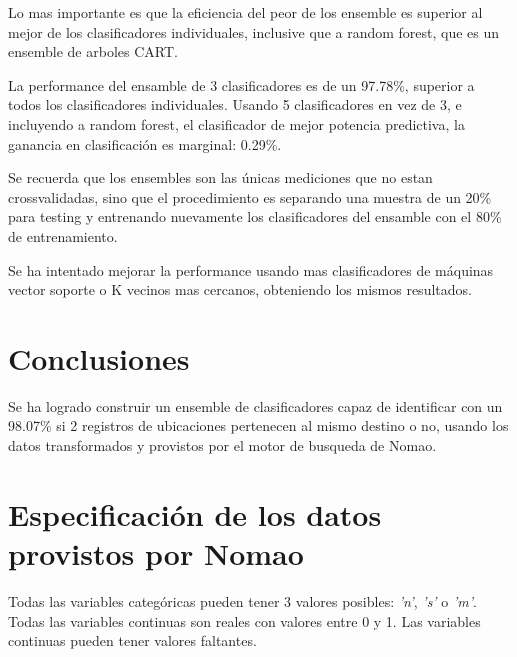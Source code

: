 \documentclass[journal]{IEEEtran}
\begin{document}
Lo mas importante es que la eficiencia del peor de los ensemble
es superior al mejor de los clasificadores individuales, inclusive
que a random forest, que es un ensemble de arboles CART.

La performance del ensamble de 3 clasificadores es de un 97.78\%, 
superior a todos los clasificadores individuales. Usando
5 clasificadores en vez de 3, e incluyendo a random forest, el clasificador de 
mejor potencia predictiva, la ganancia en clasificación es marginal: 0.29\%.

Se recuerda que los ensembles son las únicas
mediciones que no estan crossvalidadas, sino que el 
procedimiento es separando una muestra de un 20\% para testing y
entrenando nuevamente  los clasificadores del ensamble con el 80\%
de entrenamiento.

Se ha intentado mejorar la performance usando mas clasificadores de
máquinas vector soporte o K vecinos mas cercanos, obteniendo los
mismos resultados. 

\section{Conclusiones}
Se ha logrado construir un ensemble de clasificadores capaz de identificar
con un 98.07\% si 2 registros de ubicaciones pertenecen al mismo destino o no,
usando los datos transformados y provistos por el motor de busqueda de Nomao.



\appendices

\section{Especificación de los datos provistos por Nomao}
\label{appendix1}
Todas las variables categóricas pueden tener 3 valores posibles:
\textit{'n'}, \textit{'s'} o \textit{'m'}.
Todas las variables continuas son reales con valores entre 
0 y 1. Las variables continuas pueden tener valores faltantes.
\end{document}
